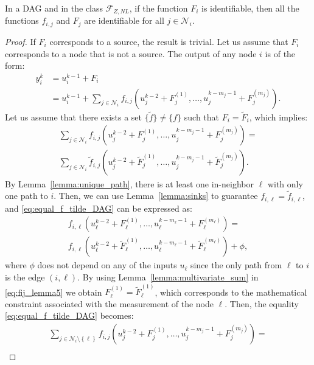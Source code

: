 \documentclass[10pt,a4paper]{amsart}
\newcommand{\Ftwo}{\mathcal{F}_{Z,NL}}
\newcommand{\NN}{\mathcal{N}}
\newcommand{\brc}[1]{\left\{#1\right\}}
\begin{document}
\begin{lemma}\label{lemma:recursively}
 In a DAG and in the class $\Ftwo$, if the function $F_i$ is identifiable, then all the functions $f_{i,j}$ and 
$F_j$ are identifiable for all $j\in \NN_i$.
\end{lemma}

\begin{proof}
    If $F_i$ corresponds to a source, the result is trivial. Let us assume that $F_i$ corresponds to a node that is not a source. 
    The output of any node $i$ is of the form:
    \begin{align}
        y_i^k&=u_i^{k-1}+F_i\nonumber\\
        &=u_i^{k-1}\!+\!\sum_{j\in\NN_i}\!f_{i,j}(u_{j}^{k-2}\!+\!F_{j}^{(1)},\ldots,u_{j}^{k-m_{j}-1}\!+\!F_{j}^{(m_{j})}).\nonumber
    \end{align}
    Let us assume that
    there exists a set $\{\tilde f\}\neq \{ f\}$ such that $F_i=\tilde F_i$, which implies:
\begin{multline}\label{eq:equal_f_tilde_DAG}
        \sum_{j\in\NN_i}f_{i,j}(u_{j}^{k-2}+F_{j}^{(1)},\ldots,u_{j}^{k-m_{j}-1}+F_{j}^{(m_{j})})=\\
        \sum_{j\in\NN_i}\tilde f_{i,j}(u_{j}^{k-2}+\tilde F_{j}^{(1)},\ldots,u_{j}^{k-m_{j}-1}+\tilde F_{j}^{(m_{j})}).
    \end{multline}
By Lemma~\ref{lemma:unique_path}, there is at least one in-neighbor $\ell$ with only one path to $i$. 
Then, we can use Lemma~\ref{lemma:sinks} to guarantee $f_{i,\ell}=\tilde f_{i,\ell}$, and \eqref{eq:equal_f_tilde_DAG} can be expressed as:
\begin{multline}\label{eq:fij_lemma5}
    f_{i,\ell}(u_{\ell}^{k-2}+F_{\ell}^{(1)},\ldots,u_{\ell}^{k-m_{\ell}-1}+F_{\ell}^{(m_{\ell})})=\\
         f_{i,\ell}(u_{\ell}^{k-2}+\tilde F_{\ell}^{(1)},\ldots,u_{\ell}^{k-m_{\ell}-1}+\tilde F_{\ell}^{(m_{\ell})})+\phi,
\end{multline}
where $\phi$ does not depend on any of the inputs $u_\ell$ since the only path from $\ell$ to $i$ is the edge $(i,\ell)$. 
By using Lemma~\ref{lemma:multivariate_sum} in \eqref{eq:fij_lemma5} we obtain $F_{\ell}^{(1)}=\tilde F_{\ell}^{(1)}$, which corresponds to the mathematical constraint associated with the measurement of the node $\ell$.
Then, the equality \eqref{eq:equal_f_tilde_DAG} becomes:
\begin{multline}\label{eq:node_i2_Volterra}
\sum_{j\in\NN_i\setminus\brc{\ell}}f_{i,j}(u_{j}^{k-2}+F_{j}^{(1)},\ldots,u_{j}^{k-m_{j}-1}+F_{j}^{(m_{j})})=\\

\end{multline}
\end{proof}
\end{document}
